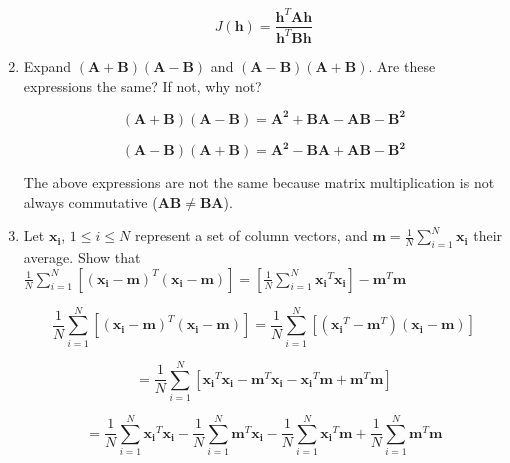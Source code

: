 \documentclass[fleqn]{article}
\begin{document}
\begin{enumerate}
		\begin{equation*}
			J(\mathbf{h}) = \frac{\mathbf{h}^T\mathbf{A}\mathbf{h}}{\mathbf{h}^T\mathbf{B}\mathbf{h}}
		\end{equation*}
		
		\item Expand $(\mathbf{A} + \mathbf{B})(\mathbf{A} - \mathbf{B})$ and $(\mathbf{A} - \mathbf{B})(\mathbf{A} + \mathbf{B})$. Are these expressions the same? If not, why not?
		
		\begin{equation*}
		(\mathbf{A} + \mathbf{B})(\mathbf{A} - \mathbf{B}) = \mathbf{A^2} + \mathbf{B}\mathbf{A} - \mathbf{A}\mathbf{B} - \mathbf{B^2}
		\end{equation*}
		
		\begin{equation*}
		(\mathbf{A} - \mathbf{B})(\mathbf{A} + \mathbf{B}) = \mathbf{A^2} - \mathbf{B}\mathbf{A} + \mathbf{A}\mathbf{B} - \mathbf{B^2}
		\end{equation*}
		
		The above expressions are not the same because matrix multiplication is not always commutative ($\mathbf{AB} \neq \mathbf{BA}$).
		
		\item Let $\mathbf{x_i}$, $1 \leq i \leq N$ represent a set of column vectors, and $\mathbf{m} = \frac{1}{N}\sum_{i=1}^{N}{\mathbf{x_i}}$ their average. Show that $\frac{1}{N}\sum_{i=1}^{N}\left[(\mathbf{x_i}-\mathbf{m})^T(\mathbf{x_i}-\mathbf{m})\right] = \left[\frac{1}{N}\sum_{i=1}^{N}{\mathbf{x_i}^T\mathbf{x_i}}\right]-\mathbf{m}^T\mathbf{m}$
		
		\begin{equation*}
			\frac{1}{N}\sum_{i=1}^{N}\left[(\mathbf{x_i}-\mathbf{m})^T(\mathbf{x_i}-\mathbf{m})\right] = \frac{1}{N}\sum_{i=1}^{N}\left[(\mathbf{x_i}^T-\mathbf{m}^T)(\mathbf{x_i}-\mathbf{m})\right]
		\end{equation*}
			
		\begin{equation*}
			 = \frac{1}{N}\sum_{i=1}^{N}\left[\mathbf{x_i}^T\mathbf{x_i}-\mathbf{m}^T\mathbf{x_i}-\mathbf{x_i}^T\mathbf{m}+\mathbf{m}^T\mathbf{m}\right]
		\end{equation*}
		
		\begin{equation*}
			 = \frac{1}{N}\sum_{i=1}^{N}{\mathbf{x_i}^T\mathbf{x_i}}-\frac{1}{N}\sum_{i=1}^{N}{\mathbf{m}^T\mathbf{x_i}}-\frac{1}{N}\sum_{i=1}^{N}{\mathbf{x_i}^T\mathbf{m}}+\frac{1}{N}\sum_{i=1}^{N}{\mathbf{m}^T\mathbf{m}}
		\end{equation*}
				

\end{enumerate}
\end{document}
